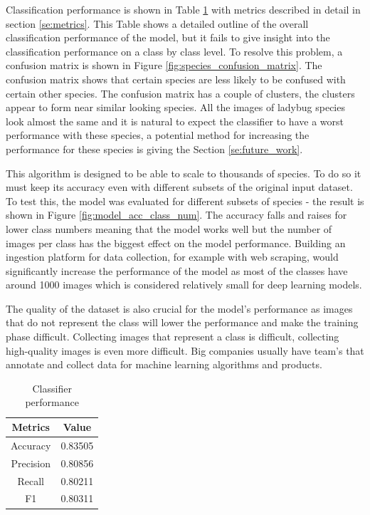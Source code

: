 \documentclass[times, utf8, diplomski]{fer}
\begin{document}
Classification performance is shown in Table \ref{tb:classifier_performance} with metrics described in detail in section \ref{se:metrics}. This Table shows a detailed outline of the overall classification performance of the model, but it fails to give insight into the classification performance on a class by class level. To resolve this problem, a confusion matrix is shown in Figure \ref{fig:species_confusion_matrix}. The confusion matrix shows that certain species are less likely to be confused with certain other species. The confusion matrix has a couple of clusters, the clusters appear to form near similar looking species. All the images of ladybug species look almost the same and it is natural to expect the classifier to have a worst performance with these species, a potential method for increasing the performance for these species is giving the Section \ref{se:future_work}.

This algorithm is designed to be able to scale to thousands of species. To do so it must keep its accuracy even with different subsets of the original input dataset. To test this, the model was evaluated for different subsets of species - the result is shown in Figure \ref{fig:model_acc_class_num}. The accuracy falls and raises for lower class numbers meaning that the model works well but the number of images per class has the biggest effect on the model performance. Building an ingestion platform for data collection, for example with web scraping, would significantly increase the performance of the model as most of the classes have around 1000 images which is considered relatively small for deep learning models. 

The quality of the dataset is also crucial for the model's performance as images that do not represent the class will lower the performance and make the training phase difficult. Collecting images that represent a class is difficult, collecting high-quality images is even more difficult. Big companies usually have team's that annotate and collect data for machine learning algorithms and products.

\begin{table}
\centering
\caption{Classifier performance}
\label{tb:classifier_performance}
\begin{tabular}{cc}
\hline 
Metrics & Value \\ \hline 
Accuracy &  0.83505\\ 
Precision & 0.80856 \\ 
Recall & 0.80211 \\
F1 & 0.80311 \\
\hline 
\end{tabular} 
\end{table}
\end{document}
